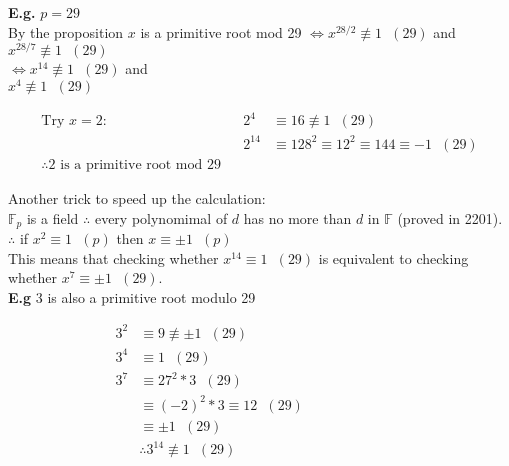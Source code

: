 \documentclass[11pt]{article}
\begin{document}
\textbf{E.g.} $p=29$\\
By the proposition $x$ is a primitive root mod 29 $\iff x^{28/2} \not \equiv 1\hspace{7pt} (29)$ and \\
\hspace{259pt} $x^{28/7} \not \equiv 1 \hspace{7pt} (29)$\\[1em]

\hspace{230pt} $\iff x^{14} \not \equiv 1 \hspace{7pt} (29) $ and\\
\hspace{259pt} $x^4 \not \equiv 1\hspace{7pt} (29)$ 


\begin{align*}
	\text{Try }x=2: &&2^4 &\equiv 16 \not \equiv 1\hspace{7pt} (29)  \\
	&& 2^{14} &\equiv 128^2 \equiv 12^2 \equiv 144 \equiv -1 \hspace{7pt} (29)\\
	\therefore 2 \text{ is a primitive root mod 29}
\end{align*}

Another trick to speed up the calculation:\\
$\mathbb{F}_p$ is a field $\therefore$ every polynomimal of $d$ has no more than $d$ in $\mathbb{F}$ (proved in 2201).\\
\hspace{55pt} $\therefore$ if $x^2 \equiv 1 \hspace{7pt} (p)$ then $x \equiv \pm 1 \hspace{7pt} (p)$
\\[1em]  


This means that checking whether $x^{14} \equiv 1 \hspace{7pt}(29)$ is equivalent to checking whether $x^7 \equiv \pm 1 \hspace{7pt} (29)$.
\\[1em]

\textbf{E.g} 3 is also a primitive root modulo 29

\begin{align*}
	3^2& \equiv 9 \not \equiv \pm 1 \hspace{7pt} (29) &&&&&&&&&\\
	3^4& \equiv 1 \hspace{7pt} (29)\\[1em]
	3^7& \equiv 27^2 * 3 \hspace{7pt} (29)\\
	&\equiv (-2)^2 * 3 \equiv 12 \hspace{7pt} (29)\\
	&\equiv \pm 1 \hspace{7pt}(29) \\[1em]
	&\therefore 3^{14} \not \equiv 1 \hspace{7pt} (29)
\end{align*}
\end{document}
